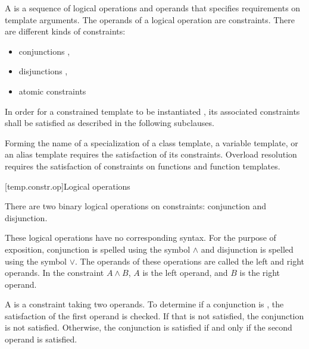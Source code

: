 \documentclass{wg21}
\begin{document}
\pnum
A  is a sequence of logical operations and
operands that specifies requirements on template arguments.
The operands of a logical operation are constraints.
There are  different kinds of constraints:
\begin{itemize}
    \item conjunctions ,
    \item disjunctions , 
    \item atomic constraints 
\end{itemize}

\pnum
In order for a constrained template to be instantiated ,
its associated constraints 
shall be satisfied as described in the following subclauses.
\begin{note}
    Forming the name of a specialization of
    a class template,
    a variable template, or
    an alias template 
    requires the satisfaction of its constraints.
    Overload resolution 
    requires the satisfaction of constraints
    on functions and function templates.
\end{note}

[temp.constr.op]{Logical operations}

\pnum
There are two binary logical operations on constraints: conjunction
and disjunction.
\begin{note}
    These logical operations have no corresponding \Cpp{} syntax.
    For the purpose of exposition, conjunction is spelled
    using the symbol $\land$ and disjunction is spelled using the
    symbol $\lor$.
    The operands of these operations are called the left
    and right operands. In the constraint $A \land B$,
    $A$ is the left operand, and $B$ is the right operand.
\end{note}

\pnum
A  is a constraint taking two
operands.
To determine if a conjunction is
,
the satisfaction of
the first operand is checked.
If that is not satisfied, the conjunction is not satisfied.
Otherwise, the conjunction is satisfied if and only if the second
operand is satisfied.
\end{document}
